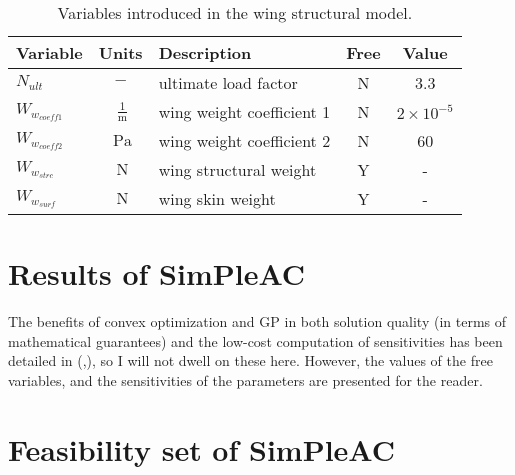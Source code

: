 \begin{footnotesize}
\begin{table}
    \centering
    \begin{tabular}{ l c l c c }
        \toprule
        Variable & Units & Description & Free & Value \\
        \midrule
        $N_{ult}$ & $-$ & ultimate load factor & N & 3.3 \\
        $W_{w_{coeff1}}$ & $~\mathrm{\tfrac{1}{m}}$ & wing weight coefficient 1 & N &
                $\mathrm{2\times 10^{-5}}$ \\
        $W_{w_{coeff2}}$ & $~\mathrm{Pa}$ & wing weight coefficient 2 & N & 60 \\
        $W_{w_{strc}}$ & $~\mathrm{N}$ & wing structural weight & Y & - \\
        $W_{w_{surf}}$ & $~\mathrm{N}$ & wing skin weight & Y & - \\
    \bottomrule
    \end{tabular}
    \caption{Variables introduced in the wing structural model.}
    \label{t:vars_wingstrcmodel}
\end{table} \end{footnotesize}

\section{Results of SimPleAC}

The benefits of convex optimization and \gls{GP} in both solution
quality (in terms of mathematical guarantees) and the low-cost
computation of sensitivities has been detailed in (\cite{gp_ac_design},\cite{sp_ac_design}),
so I will not dwell on these here. However, the values of the free variables,
and the sensitivities of the parameters are presented for the reader.

\begin{center}

    \label{t:SimPleAC_results}
\end{center}

\begin{center}

    \label{t:SimPleAC_sens}
\end{center}

\section{Feasibility set of SimPleAC}




